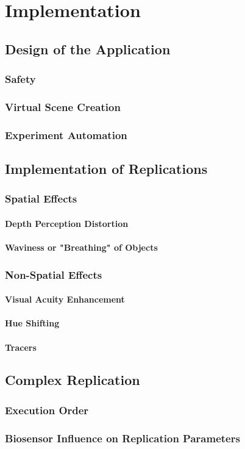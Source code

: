 \chapter{Implementation}
\vspace{-1.6em}
%

\minitoc
\thispagestyle{empty}
\newpage

\section{Design of the Application}
\subsection{Safety}
\subsection{Virtual Scene Creation}
\subsection{Experiment Automation}
\section{Implementation of Replications}
\subsection{Spatial Effects}
\subsubsection{Depth Perception Distortion}

\autocite{fischer1970psilocybin}

\subsubsection{Waviness or "Breathing" of Objects}
\subsection{Non-Spatial Effects}
\subsubsection{Visual Acuity Enhancement}
\subsubsection{Hue Shifting}
\subsubsection{Tracers}
\section{Complex Replication}
\subsection{Execution Order}
\subsection{Biosensor Influence on Replication Parameters}

